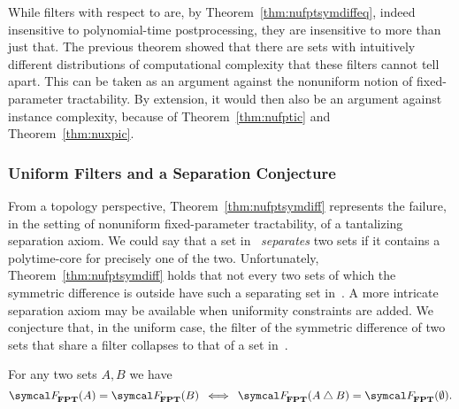 While filters with respect to  are, by Theorem~\ref{thm:nufptsymdiffeq}, indeed insensitive to polynomial-time postprocessing, they are insensitive to more than just that.
The previous theorem showed that there are sets with intuitively different distributions of computational complexity that these filters cannot tell apart.
This can be taken as an argument against the nonuniform notion of fixed-parameter tractability.
By extension, it would then also be an argument against instance complexity, because of Theorem~\ref{thm:nufptic} and Theorem~\ref{thm:nuxpic}.

\subsubsection{Uniform Filters and a Separation Conjecture}
From a topology perspective, Theorem~\ref{thm:nufptsymdiff} represents the failure, in the setting of nonuniform fixed-parameter tractability, of a tantalizing separation axiom.
We could say that a set in~ \emph{separates} two sets if it contains a polytime-core for precisely one of the two.
Unfortunately, Theorem~\ref{thm:nufptsymdiff} holds that not every two sets of which the symmetric difference is outside  have such a separating set in~.
A more intricate separation axiom may be available when uniformity constraints are added.
We conjecture that, in the uniform case, the filter of the symmetric difference of two sets that share a filter collapses to that of a set in~.
\begin{conjecture}
\label{con:fptsymdiff}%
  For any two sets $A, B$ we have
  \begin{equation*}
    \calF_\cl{FPT}(A) = \calF_\cl{FPT}(B) \:\iff\: \calF_\cl{FPT}(A \symdiff B) = \calF_\cl{FPT}(\emptyset).
  \end{equation*}
\end{conjecture}

